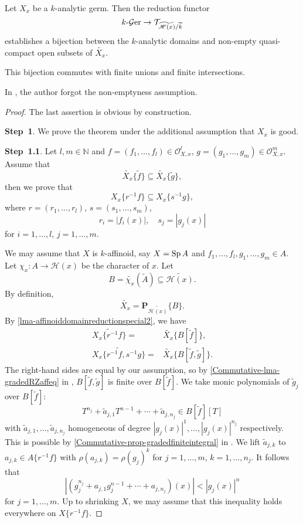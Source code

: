 \begin{thm}\label{thm-gradedreddomainbij}
    Let $X_x$ be a $k$-analytic germ. Then the reduction functor  
    \[
        k\text{-}\mathcal{G}\mathrm{er}\rightarrow \mathcal{T}_{\widetilde{\mathscr{H}(x)}/\widetilde{k}} 
    \]
    establishes a bijection between the $k$-analytic domains and non-empty quasi-compact open subsets of $\widetilde{X_x}$.

    This bijection commutes with finite unions and finite intersections. 
\end{thm}
In \cite{Tem04}, the author forgot the non-emptyness assumption.

\begin{proof}
    The last assertion is obvious by construction.

    \textbf{Step~1}. We prove the theorem under the additional assumption that $X_x$ is good.

    \textbf{Step~1.1}. Let $l,m\in \mathbb{N}$ and $f=(f_1,\ldots,f_l)\in \mathcal{O}_{X,x}^l$, $g=(g_1,\ldots,g_m)\in \mathcal{O}_{X,x}^m$. Assume that 
    \[
        \widetilde{X_x}\{\tilde{f}\}\subseteq  \widetilde{X_x}\{\tilde{g}\}, 
    \]
    then we prove that 
    \[
        X_x\{r^{-1}f\}\subseteq X_x\{s^{-1}g\},  
    \]
    where $r=(r_1,\ldots,r_l)$, $s=(s_1,\ldots,s_m)$,
    \[
        r_i=|f_i(x)|,\quad s_j=|g_j(x)|  
    \]
    for $i=1,\ldots,l$, $j=1,\ldots,m$.


    We may assume that $X$ is $k$-affinoid, say $X=\operatorname{Sp} A$ and $f_1,\ldots,f_l,g_1,\ldots,g_m\in A$. Let $\chi_x:A\rightarrow \mathscr{H}(x)$ be the character of $x$. Let
    \[
        B=\widetilde{\chi_x}(\tilde{A})\subseteq \widetilde{\mathscr{H}(x)}.  
    \]
    By definition,
    \[
        \widetilde{X_x}=\mathbf{P}_{\widetilde{\mathscr{H}(x)}}\{B\}.  
    \]
    By \cref{lma-affinoiddomainreductionspecial2}, we have
    \[
        \begin{aligned}
        \widetilde{X_x\{r^{-1}f\}}=&\widetilde{X_x}\{B[\tilde{f}]\},\\
        \widetilde{X_x\{r^{-1}f,s^{-1}g\}}=&\widetilde{X_x}\{B[\tilde{f},\tilde{g}]\}.
        \end{aligned}
    \]
    The right-hand sides are equal by our assumption, so by \cref{Commutative-lma-gradedRZaffeq} in , $B[\tilde{f},\tilde{g}]$ is finite over $B[\tilde{f}]$. We take monic polynomials of $\tilde{g}_j$ over $B[\tilde{f}]$:
    \[
        T^{n_j}+\tilde{a}_{j,1}T^{n-1}+\cdots+\tilde{a}_{j,n_j}\in B[\tilde{f}][T]
    \]
    with $\tilde{a}_{j,1},\ldots,\tilde{a}_{j,n_j}$ homogeneous of degree $|g_j(x)|^{1},\ldots,|g_j(x)|^{n_j}$ respectively. This is possible by \cref{Commutative-prop-gradedfiniteintegral} in . We lift $\tilde{a}_{j,k}$ to $a_{j,k}\in A\{r^{-1}f\}$ with $\rho(a_{j,k})=\rho(g_j)^k$ for $j=1,\ldots,m$, $k=1,\ldots,n_j$. It follows that 
    \[
        \left|\left(g_j^{n_j}+a_{j,1}g_j^{n-1}+\cdots+a_{j,n_j}\right)(x)\right|<|g_j(x)|^n
    \]
    for $j=1,\ldots,m$. Up to shrinking $X$, we may assume that this inequality holds everywhere on $X\{r^{-1}f\}$. 


\end{proof}

